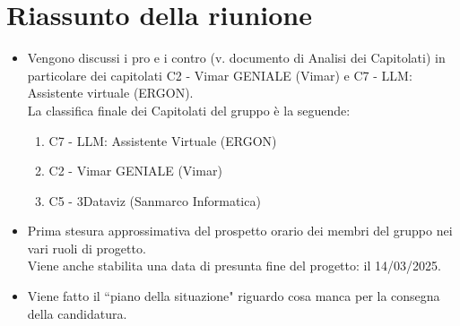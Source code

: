 \section{Riassunto della riunione}
\begin{itemize}
    \item Vengono discussi i pro e i contro (v. documento di Analisi dei Capitolati) in particolare dei capitolati C2 - Vimar GENIALE (Vimar) e C7 - LLM: Assistente virtuale (ERGON).\\
    La classifica finale dei Capitolati del gruppo è la seguende:
        \begin{enumerate}
            \item C7 - LLM: Assistente Virtuale (ERGON)
            \item C2 - Vimar GENIALE (Vimar)
            \item C5 - 3Dataviz (Sanmarco Informatica)
        \end{enumerate}  
    \item Prima stesura approssimativa del prospetto orario dei membri del gruppo nei vari ruoli di progetto.\\
    Viene anche stabilita una data di presunta fine del progetto: il 14/03/2025.
    \item Viene fatto il ``piano della situazione" riguardo cosa manca per la consegna della candidatura.
\end{itemize}



